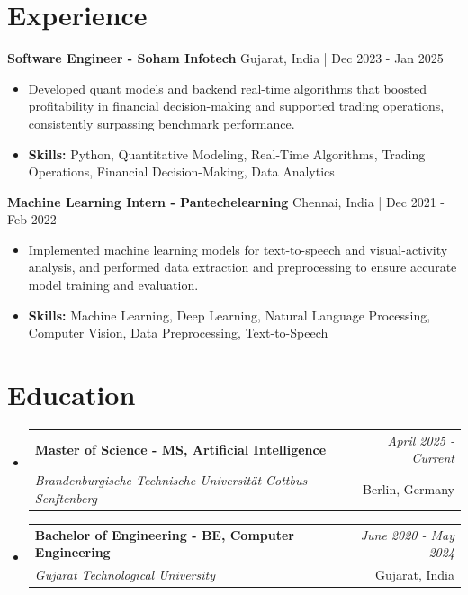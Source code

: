 \documentclass[a4paper,11pt]{article}
\makeatletter
\newcommand{\resumeSubheading}[4]{
\vspace{0.5mm}\item
    \begin{tabular*}{\linewidth}[t]{l@{\extracolsep{\fill}}r}
        \textbf{#1} & \textit{\footnotesize{#4}} \\
        \textit{\footnotesize{#3}} &  \footnotesize{#2}\\
    \end{tabular*}
    \vspace{-2.4mm}
}
\makeatother
\begin{document}
\section{\textbf{Experience}}


\vspace{1mm}
  \textbf{Software Engineer - Soham Infotech} \hfill Gujarat, India | Dec 2023 - Jan 2025
\vspace{-1.5mm} %
\begin{itemize}
  \item Developed quant models and backend real-time algorithms that boosted profitability in financial decision-making and supported trading operations, consistently surpassing benchmark performance.

\vspace{-2mm}
  \item \textbf{Skills:} Python, Quantitative Modeling, Real-Time Algorithms, Trading Operations, Financial Decision-Making, Data Analytics
\end{itemize}

\vspace{1mm}
  \textbf{Machine Learning Intern - Pantechelearning} \hfill Chennai, India | Dec 2021 - Feb 2022
\vspace{-1.5mm} %
\begin{itemize}
  \item Implemented machine learning models for text-to-speech and visual-activity analysis, and performed data extraction and preprocessing to ensure accurate model training and evaluation.
\vspace{-2mm}
  \item \textbf{Skills:} Machine Learning, Deep Learning, Natural Language Processing, Computer Vision, Data Preprocessing, Text-to-Speech
\end{itemize}\section{\textbf{Education}}
\vspace{-0.4mm}

\begin{itemize}[leftmargin=0.15in, label={}]
\resumeSubheading
{Master of Science - MS, Artificial Intelligence }{Berlin, Germany}
{Brandenburgische Technische Universität Cottbus-Senftenberg  }{April 2025 - Current}

\vspace{1.0mm} %
\resumeSubheading
{Bachelor of Engineering - BE, Computer Engineering  }{Gujarat, India}
{Gujarat Technological University }{June 2020 - May 2024}

\end{itemize}
\end{document}
